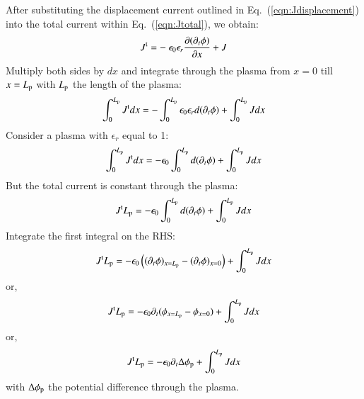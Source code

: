 \documentclass{warpdoc}
\begin{document}
After substituting the displacement current outlined in Eq.\ (\ref{eqn:Jdisplacement}) into the total current within Eq.\ (\ref{eqn:Jtotal}), we obtain:
%
\begin{equation}
 J^{\rm t} =
  -~\epsilon_0 \epsilon_r \frac{\partial (\partial_t \phi)}{\partial x}
+J
\end{equation}
%
Multiply both sides by $dx$ and integrate through the plasma from $x=0$ till $x=L_{\rm p}$ with $L_{\rm p}$ the length of the plasma:
%
\begin{equation}
\int_0^{L_{\rm p}} J^{\rm t} dx =
  - \int_0^{L_{\rm p}} \epsilon_0 \epsilon_r d (\partial_t \phi)
+\int_0^{L_{\rm p}} J dx
\end{equation}
%
Consider a plasma with $\epsilon_r$ equal to 1:
%
\begin{equation}
\int_0^{L_{\rm p}} J^{\rm t} dx =
  - \epsilon_0  \int_0^{L_{\rm p}}  d (\partial_t \phi)
+\int_0^{L_{\rm p}} J dx
\end{equation}
%
But the total current is constant through the plasma:
%
\begin{equation}
J^{\rm t} L_{\rm p}=
  - \epsilon_0  \int_0^{L_{\rm p}}  d (\partial_t \phi)
+\int_0^{L_{\rm p}} J dx
\end{equation}
%
Integrate the first integral on the RHS:
%
\begin{equation}
J^{\rm t} L_{\rm p}=
  - \epsilon_0  \left( (\partial_t \phi)_{x=L_{\rm p}} - (\partial_t \phi)_{x=0} \right)
+\int_0^{L_{\rm p}} J dx
\end{equation}
%
or,
%
\begin{equation}
J^{\rm t} L_{\rm p}=
  - \epsilon_0  \partial_t (\phi_{x=L_{\rm p}} - \phi_{x=0}) 
+\int_0^{L_{\rm p}} J dx
\end{equation}
%
or,
%
\begin{equation}
J^{\rm t} L_{\rm p}=
  - \epsilon_0  \partial_t \Delta \phi_{\rm p} 
+\int_0^{L_{\rm p}} J dx
\label{eqn:JtLp1}
\end{equation}
%
with $\Delta \phi_{\rm p}$ the potential difference through the plasma. 
\end{document}
